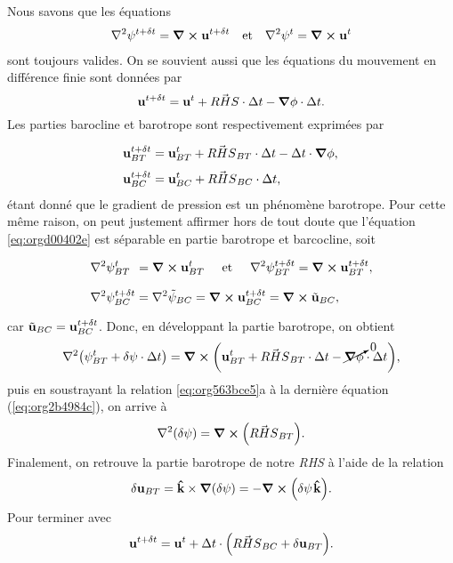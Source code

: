 \documentclass[10pt]{article}
\numberwithin{equation}{section}
\newcommand{\kvf}{\vb{\hat{k}}}
\newcommand{\uu}{\vb{u}}
\newcommand{\grande}{\vphantom{\frac{1}{xx}}}
\newcommand{\pt}{\hspace{1pt}} %
\begin{document}
Nous savons que les équations
\begin{align}
\label{eq:orgd00402e}
   &&\laplacian{\psi^{t+\delta t}} = \curl{\uu^{t+\delta t}}
   &&\text{et}
   &&\laplacian{\psi^{t}} = \curl{\uu^{t}}&&
\end{align}
sont toujours valides. 
On se souvient aussi que les équations du mouvement en différence finie sont données par 
\begin{equation}
   \uu^{t+\delta t} =
   \uu^t + \vec{RHS}\cdot \Delta t
   - \gradient{\phi}\cdot \Delta t.
\end{equation}
Les parties barocline et barotrope sont respectivement exprimées par
\begin{subequations}
\begin{align}
   &\uu_{BT}^{t+\delta t} = \uu_{BT}^{t} + \vec{RHS}_{BT}\cdot \Delta t - \Delta t\cdot \gradient{\phi},\grande\\
   &\uu_{BC}^{t+\delta t} = \uu_{BC}^{t} + \vec{RHS}_{BC}\cdot \Delta t,
\end{align}
\end{subequations}
étant donné que le gradient de pression est un phénomène barotrope.
Pour cette même raison, on peut justement affirmer hors de tout doute que l'équation \ref{eq:orgd00402e} est séparable en partie barotrope et barcocline, soit
\begin{subequations}
\label{eq:org563bce5}
\begin{align}
   &\grande\laplacian{\psi_{BT}^{t}}\ \pt = \curl{\uu_{BT}^{t}}
   \hspace{0.5cm}\text{et}\hspace{0.5cm}
   \laplacian{\psi_{BT}^{t+\delta t}} = \curl{\uu_{BT}^{t+\delta t}},\\
   &\grande\laplacian{\psi_{BC}^{t+\delta t}} = \laplacian{\tilde{\psi}_{BC}} = \curl{\uu_{BC}^{t+\delta t}} = \curl{\tilde{\uu}_{BC}},
\end{align}
\end{subequations}
car \(\tilde{\uu}_{BC} = \uu^{t+\delta t}_{BC}\).
Donc, en développant la partie barotrope, on obtient
\begin{equation}
\label{eq:org2b4984c}
   \laplacian(\psi_{BT}^t+\delta \psi \cdot \Delta t) = \curl(\uu^t_{BT} + \vec{RHS}_{BT}\cdot\Delta t - \cancelto{0}{\gradient{\phi}}\cdot \Delta t),
\end{equation}
puis en soustrayant la relation \ref{eq:org563bce5}a à la dernière équation (\ref{eq:org2b4984c}), on arrive à
\begin{equation}
   \laplacian(\delta \psi) = \curl(\vec{RHS}_{BT}).
\end{equation}
Finalement, on retrouve la partie barotrope de notre \emph{RHS} à l'aide de la relation
\begin{equation}
   \delta \uu_{BT} = \kvf\times\gradient(\delta \psi) = -\curl(\delta\psi\pt\kvf).
\end{equation}
Pour terminer avec
\begin{equation}
   \uu^{t+\delta t} =
   \uu^t + \Delta t\cdot\qty(\vec{RHS}_{BC}
   + \delta \uu_{BT}).
\end{equation}
\end{document}
